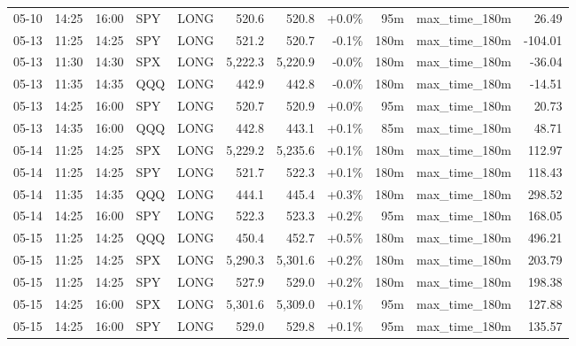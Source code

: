 \documentclass[11pt,a4paper,twoside]{article}
\begin{document}
\begin{center}
\begin{longtable}{>{\color{txtmain}}l l l l l r r r r >{\color{txtmain}}l r}
05-10 & 14:25 & 16:00 & SPY & LONG & 520.6 & 520.8 & \textcolor{wingreen}{+0.0\%} & 95m & max\_time\_180m & \textcolor{wingreen}{26.49} \\
05-13 & 11:25 & 14:25 & SPY & LONG & 521.2 & 520.7 & \textcolor{lossred}{-0.1\%} & 180m & max\_time\_180m & \textcolor{lossred}{-104.01} \\
05-13 & 11:30 & 14:30 & SPX & LONG & 5,222.3 & 5,220.9 & \textcolor{lossred}{-0.0\%} & 180m & max\_time\_180m & \textcolor{lossred}{-36.04} \\
05-13 & 11:35 & 14:35 & QQQ & LONG & 442.9 & 442.8 & \textcolor{lossred}{-0.0\%} & 180m & max\_time\_180m & \textcolor{lossred}{-14.51} \\
05-13 & 14:25 & 16:00 & SPY & LONG & 520.7 & 520.9 & \textcolor{wingreen}{+0.0\%} & 95m & max\_time\_180m & \textcolor{wingreen}{20.73} \\
05-13 & 14:35 & 16:00 & QQQ & LONG & 442.8 & 443.1 & \textcolor{wingreen}{+0.1\%} & 85m & max\_time\_180m & \textcolor{wingreen}{48.71} \\
05-14 & 11:25 & 14:25 & SPX & LONG & 5,229.2 & 5,235.6 & \textcolor{wingreen}{+0.1\%} & 180m & max\_time\_180m & \textcolor{wingreen}{112.97} \\
05-14 & 11:25 & 14:25 & SPY & LONG & 521.7 & 522.3 & \textcolor{wingreen}{+0.1\%} & 180m & max\_time\_180m & \textcolor{wingreen}{118.43} \\
05-14 & 11:35 & 14:35 & QQQ & LONG & 444.1 & 445.4 & \textcolor{wingreen}{+0.3\%} & 180m & max\_time\_180m & \textcolor{wingreen}{298.52} \\
05-14 & 14:25 & 16:00 & SPY & LONG & 522.3 & 523.3 & \textcolor{wingreen}{+0.2\%} & 95m & max\_time\_180m & \textcolor{wingreen}{168.05} \\
05-15 & 11:25 & 14:25 & QQQ & LONG & 450.4 & 452.7 & \textcolor{wingreen}{+0.5\%} & 180m & max\_time\_180m & \textcolor{wingreen}{496.21} \\
05-15 & 11:25 & 14:25 & SPX & LONG & 5,290.3 & 5,301.6 & \textcolor{wingreen}{+0.2\%} & 180m & max\_time\_180m & \textcolor{wingreen}{203.79} \\
05-15 & 11:25 & 14:25 & SPY & LONG & 527.9 & 529.0 & \textcolor{wingreen}{+0.2\%} & 180m & max\_time\_180m & \textcolor{wingreen}{198.38} \\
05-15 & 14:25 & 16:00 & SPX & LONG & 5,301.6 & 5,309.0 & \textcolor{wingreen}{+0.1\%} & 95m & max\_time\_180m & \textcolor{wingreen}{127.88} \\
05-15 & 14:25 & 16:00 & SPY & LONG & 529.0 & 529.8 & \textcolor{wingreen}{+0.1\%} & 95m & max\_time\_180m & \textcolor{wingreen}{135.57} \\

\end{longtable}
\end{center}
\end{document}
